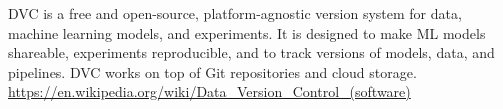 \documentclass[a4paper]{article}
\title{}
\date{}
\begin{document}
    \maketitle
    DVC is a free and open-source, platform-agnostic version system for data, machine learning models, and experiments. It is designed to make ML models shareable, experiments reproducible, and to track versions of models, data, and pipelines. DVC works on top of Git repositories and cloud storage.
    \url{https://en.wikipedia.org/wiki/Data_Version_Control_(software)}
    
\end{document}
